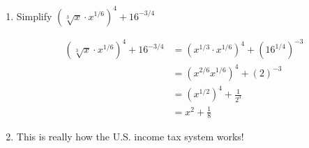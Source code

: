 \documentclass{article}
\begin{document}
\begin{enumerate}
\begin{enumerate}
    \begin{solution}
    We want to know where $f(x)=g(x)$.
\begin{align*}
    1-\sqrt{x+2}&=-2x\\
    1+2x&=\sqrt{x+2}\\
    (1+2x)^2&=(\sqrt{x+2})^2\\
    1+4x+4x^2&=x+2\\
    4x^2+3x+-1&=0    
\end{align*}
Applying the quadratic formula to find the zeros of the equation, we have:
\begin{align*}
    x&= \frac{-3\pm\sqrt{3^2-4(4)(-1)}}{2(4)}\\
x&=\frac{-3\pm\sqrt{25}}{8}\\
x&=\frac{-3\pm 5}{8}=\frac{1}{4},\, -1\\
\end{align*}
Checking these solutions, we find $f(-1) \neq g(-1)$, but $f(\frac{1}{4})=g(\frac{1}{4})$. We've found one point of intersection when $x=\frac{1}{4}$. We can find the y-value by evaluating either equation. $2(\frac{1}{4})=\frac{1}{2}$. The coordinates of the point are $\displaystyle\bigg( \frac{1}{4}, \frac{-1}{2}\bigg)$.
    \end{solution}
  \end{enumerate}

\item 
  \begin{problem}[\nstretch{0.4}]
    Simplify $\left( \sqrt[3]{x} \cdot x^{1/6} \right)^4 + 16^{-3/4}$
  \end{problem}

  \begin{solution}
  \begin{align*}
      \left( \sqrt[3]{x} \cdot x^{1/6} \right)^4 + 16^{-3/4}&= (x^{1/3}\cdot x^{1/6})^4 + (16^{1/4})^{-3}\\
      &=(x^{2/6}x^{1/6})^4+(2)^{-3}\\
      &=(x^{1/2})^4+\frac{1}{2^3}\\
      &=x^2+\frac{1}{8}
      \end{align*}
  \end{solution}

\item  \label{income-tax}

  \begin{workshop}
    This is really how the U.S. income tax system works!
  \end{workshop}


\end{enumerate}
\end{document}
